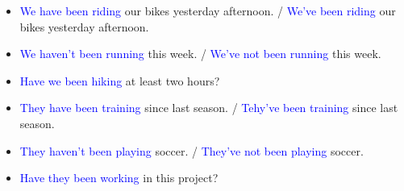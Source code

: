 \begin{multicols}{2}
\begin{itemize}
\item \textcolor{blue}{We have been riding} our bikes yesterday afternoon. / \textcolor{blue}{We've been riding} our bikes yesterday afternoon.
\item \textcolor{blue}{We haven't been running} this week. / \textcolor{blue}{We've not been running} this week.
\item \textcolor{blue}{Have we been hiking} at least two hours?

\item \textcolor{blue}{They have been training} since last season. / \textcolor{blue}{Tehy've been training} since last season.
\item \textcolor{blue}{They haven't been playing} soccer. / \textcolor{blue}{They've not been playing} soccer.
\item \textcolor{blue}{Have they been working} in this project?
\end{itemize}
\end{multicols}

